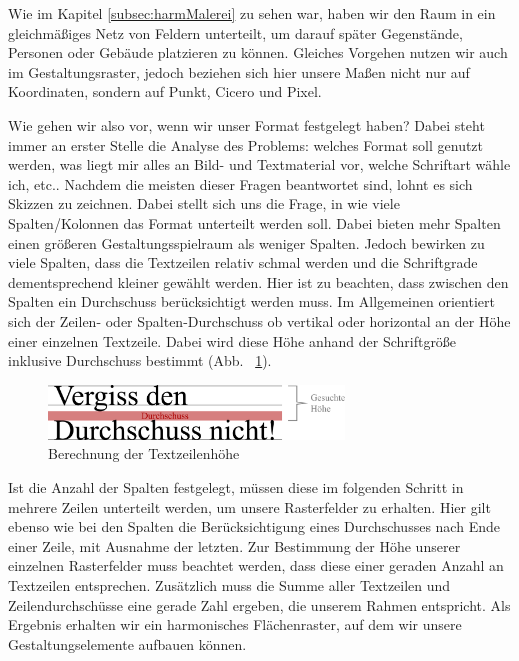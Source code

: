 \documentclass[12pt,a4paper]{article}
\begin{document}
Wie im Kapitel \ref{subsec:harmMalerei} zu sehen war, haben wir den Raum in ein gleichmäßiges Netz von Feldern unterteilt, um darauf später Gegenstände, Personen oder Gebäude platzieren zu können. Gleiches Vorgehen nutzen wir auch im Gestaltungsraster, jedoch beziehen sich hier unsere Maßen nicht nur auf Koordinaten, sondern auf Punkt, Cicero und Pixel.

Wie gehen wir also vor, wenn wir unser Format festgelegt haben? Dabei steht immer an erster Stelle die Analyse des Problems: welches Format soll genutzt werden, was liegt mir alles an Bild- und Textmaterial vor, welche Schriftart wähle ich, etc.. Nachdem die meisten dieser Fragen beantwortet sind, lohnt es sich Skizzen zu zeichnen. Dabei stellt sich uns die Frage, in wie viele Spalten/Kolonnen das Format unterteilt werden soll. Dabei bieten mehr Spalten einen größeren Gestaltungsspielraum als weniger Spalten. Jedoch bewirken zu viele Spalten, dass die Textzeilen relativ schmal werden und die Schriftgrade dementsprechend kleiner gewählt werden. Hier ist zu beachten, dass zwischen den Spalten ein Durchschuss berücksichtigt werden muss. Im Allgemeinen orientiert sich der Zeilen- oder Spalten-Durchschuss ob vertikal oder horizontal an der Höhe einer einzelnen Textzeile. Dabei wird diese Höhe anhand der Schriftgröße inklusive Durchschuss bestimmt (Abb.~ \ref{fig:durchschuss}). 

\begin{figure}[htbp]
\centering
\includegraphics[width=0.7\textwidth]{Bilder/durchschuss.png}
\caption{Berechnung der Textzeilenhöhe}
\label{fig:durchschuss}
\end{figure}

Ist die Anzahl der Spalten festgelegt, müssen diese im folgenden Schritt in mehrere Zeilen unterteilt werden, um unsere Rasterfelder zu erhalten. Hier gilt ebenso wie bei den Spalten die Berücksichtigung eines Durchschusses nach Ende einer Zeile, mit Ausnahme der letzten. Zur Bestimmung der Höhe unserer einzelnen Rasterfelder muss beachtet werden, dass diese einer geraden Anzahl an Textzeilen entsprechen. Zusätzlich muss die Summe aller Textzeilen und Zeilendurchschüsse eine gerade Zahl ergeben, die unserem Rahmen entspricht. Als Ergebnis erhalten wir ein harmonisches Flächenraster, auf dem wir unsere Gestaltungselemente aufbauen können.
\end{document}
